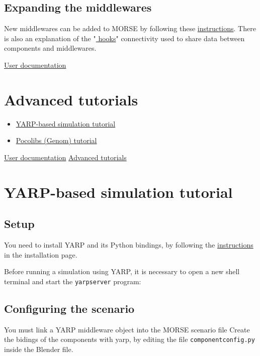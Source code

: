 \documentclass[twoside,a4paper,10pt]{report}
\newcommand{\dokutitlelevelone}[1]{\chapter{#1}}
\newcommand{\dokutitleleveltwo}[1]{\section{#1}}
\newcommand{\dokumonospace}[1]{\texttt{#1}}
\newcommand{\dokuitem}{\item}
\newcommand{\dokuquoting}{\textbar}
\begin{document}
\dokutitleleveltwo{Expanding the middlewares}
\label{b3a6313d335453f4c7ad970485acc1a1}%

New middlewares can be added to MORSE by following these \hyperref[6a8f80abb2f3d2288ad863e67f2499a4]{ instructions}. There is also an explanation of the "\hyperref[4e819c837d54a6ed09abc77a8560a66f]{ hooks}" connectivity used to share data between components and middlewares.

{\dokuquoting}{\dokuquoting} \hyperref[a80da1282f2c775bbc5f2c92c836968b]{ User documentation}


\dokutitlelevelone{Advanced tutorials}
\label{1db3103f04a8f50e1168ef3c23748f71}%
\label{1db3103f04a8f50e1168ef3c23748f71}%

\begin{itemize}
\dokuitem  \hyperref[1dd029a60f7f3dd1deaf993ce4538edf]{ YARP-based simulation tutorial}
\dokuitem  \hyperref[5c7d3aeca93d2be4626b023df992dc1d]{ Pocolibs (Genom) tutorial}
\end{itemize}
{\dokuquoting}{\dokuquoting} \hyperref[a80da1282f2c775bbc5f2c92c836968b]{ User documentation}  \hyperref[1db3103f04a8f50e1168ef3c23748f71]{ Advanced tutorials}


\dokutitlelevelone{YARP-based simulation tutorial}
\label{46a8ae159056a35cad5aad3f96f08029}%
\label{1dd029a60f7f3dd1deaf993ce4538edf}%

\dokutitleleveltwo{Setup}
\label{a0f848942ce863cf53c0fa6cc684007d}%

You need to install YARP and its Python bindings, by following the \hyperref[ec46d0b85077d7a7fe8da2e2b4c70462]{ instructions} in the installation page.

Before running a simulation using YARP, it is necessary to open a new shell terminal and start the \dokumonospace{yarpserver} program:


\small
{}
\normalsize

\dokutitleleveltwo{Configuring the scenario}
\label{a5eb0127854ee2548f6841c01cbaee73}%

You must link a YARP middleware object into the MORSE scenario file
Create the bidings of the components with yarp, by editing the file \dokumonospace{component{\textunderscore}config.py} inside the Blender file.
\end{document}
